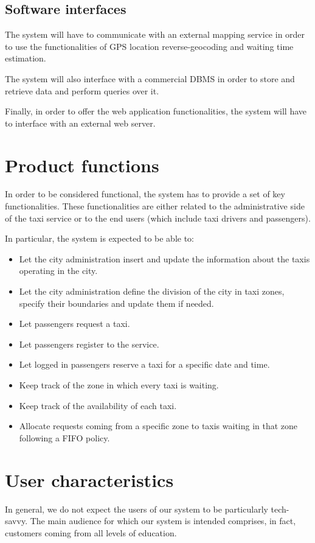 \subsection{Software interfaces}
The system will have to communicate with an external mapping service in order to use the functionalities of GPS location reverse-geocoding and waiting time estimation.

The system will also interface with a commercial DBMS in order to store and retrieve data and perform queries over it.

Finally, in order to offer the web application functionalities, the system will have to interface with an external web server.


\section{Product functions}
In order to be considered functional, the system has to provide a set of key functionalities.
These functionalities are either related to the administrative side of the taxi service or to the end users (which include taxi drivers and passengers).

In particular, the system is expected to be able to:
\begin{itemize}
\item Let the city administration insert and update the information about the taxis operating in the city.
\item Let the city administration define the division of the city in taxi zones, specify their boundaries and update them if needed.
\item Let passengers request a taxi.
\item Let passengers register to the service.
\item Let logged in passengers reserve a taxi for a specific date and time.
\item Keep track of the zone in which every taxi is waiting.
\item Keep track of the availability of each taxi.
\item Allocate requests coming from a specific zone to taxis waiting in that zone following a FIFO policy.
\end{itemize}


\section{User characteristics}
In general, we do not expect the users of our system to be particularly tech-savvy. 
The main audience for which our system is intended comprises, in fact, customers coming from all levels of education.

